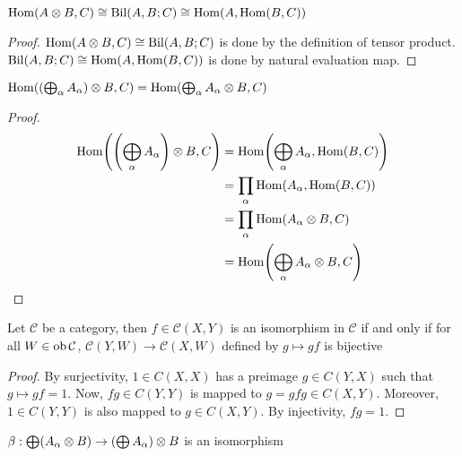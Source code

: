 \documentclass{report}
\begin{document}
\begin{proposition}
    $\operatorname{Hom}(A \otimes B, C) \cong \operatorname{Bil}(A, B; C) \cong \operatorname{Hom}(A, \operatorname{Hom}(B, C))$
\end{proposition}

\begin{proof}
    $\operatorname{Hom}(A \otimes B, C) \cong \operatorname{Bil}(A, B; C)$ is done by the definition of tensor product. $\operatorname{Bil}(A, B; C) \cong \operatorname{Hom}(A, \operatorname{Hom}(B, C))$ is done by natural evaluation map.
\end{proof}


\begin{corollary}
    $\Hom\tuple*{\tuple*{\bigoplus_\alpha A_\alpha} \otimes B, C} = \Hom \tuple*{\bigoplus_\alpha A_\alpha \otimes B, C}$
\end{corollary}

\begin{proof}
    \begin{align*}
        \Hom\tuple*{\tuple*{\bigoplus_\alpha A_\alpha} \otimes B, C}
        &= \Hom \tuple*{\bigoplus_\alpha A_\alpha, \Hom(B, C)} \\
        &= \prod_\alpha \Hom \tuple*{A_\alpha, \Hom(B, C)} \\
        &= \prod_\alpha \Hom \tuple*{A_\alpha \otimes B, C} \\
        &= \Hom \tuple*{\bigoplus_\alpha A_\alpha \otimes B, C} \\
    \end{align*}
\end{proof}

\begin{lemma}
    Let $\mathcal{C}$ be a category, then $f\in \mathcal{C}(X, Y)$ is an isomorphism in $\mathcal{C}$ if and only if for all $W \in \operatorname{ob} \mathcal{C}$, $\mathcal{C}(Y, W) \to \mathcal{C}(X, W)$ defined by $g \mapsto gf$ is bijective
\end{lemma}

\begin{proof}
    By surjectivity, $1 \in C(X, X)$ has a preimage $g \in C(Y, X)$ such that $g \mapsto gf = 1$. Now, $fg \in C(Y, Y)$ is mapped to $g = gfg \in C(X, Y)$. Moreover, $1 \in C(Y, Y)$ is also mapped to $g \in C(X, Y)$. By injectivity, $fg = 1$.
\end{proof}


\begin{proposition}
    $\beta: \bigoplus \tuple*{A_\alpha \otimes B} \to \tuple*{\bigoplus A_\alpha} \otimes B$ is an isomorphism
\end{proposition}
\end{document}
